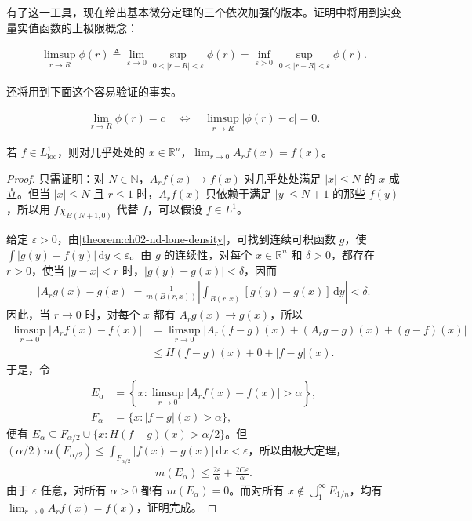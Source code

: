 \documentclass[../../main.tex]{subfiles}%
\begin{document}
有了这一工具，现在给出基本微分定理的三个依次加强的版本。证明中将用到实变量实值函数的上极限概念：
\begin{definition}[函数的上极限]\label{definition:ch03-function-limsup}
\begin{align*}
\limsup_{r\to R}\phi(r)
\triangleq\lim_{\varepsilon\to0}\sup_{0<|r-R|<\varepsilon}\phi(r)
=\inf_{\varepsilon>0}\sup_{0<|r-R|<\varepsilon}\phi(r).
\end{align*}
\end{definition}
还将用到下面这个容易验证的事实。
\begin{proposition}\label{proposition:ch03-limit-limsup-criterion}
\begin{align*}
\lim_{r\to R}\phi(r)=c\quad\Longleftrightarrow\quad\limsup_{r\to R}|\phi(r)-c|=0.
\end{align*}
\end{proposition}
\begin{theorem}\label{theorem:ch03-ball-differentiation}
若 $f\in L^1_{\mathrm{loc}}$，则对几乎处处的 $x\in\mathbb{R}^n$，$\lim_{r\to0}A_rf(x)=f(x)$。
\end{theorem}
\begin{proof}
只需证明：对 $N\in\mathbb{N}$，$A_rf(x)\to f(x)$ 对几乎处处满足 $|x|\le N$ 的 $x$ 成立。但当 $|x|\le N$ 且 $r\le1$ 时，$A_rf(x)$ 只依赖于满足 $|y|\le N+1$ 的那些 $f(y)$，所以用 $f\chi_{B(N+1,0)}$ 代替 $f$，可以假设 $f\in L^1$。

给定 $\varepsilon>0$，由\cref{theorem:ch02-nd-lone-density}，可找到连续可积函数 $g$，使 $\int|g(y)-f(y)|\,\mathrm{d}y<\varepsilon$。由 $g$ 的连续性，对每个 $x\in\mathbb{R}^n$ 和 $\delta>0$，都存在 $r>0$，使当 $|y-x|<r$ 时，$|g(y)-g(x)|<\delta$，因而
\begin{align*}
|A_rg(x)-g(x)|=\frac{1}{m(B(r,x))}\left|\int_{B(r,x)}[g(y)-g(x)]\,\mathrm{d}y\right|<\delta.
\end{align*}
因此，当 $r\to0$ 时，对每个 $x$ 都有 $A_rg(x)\to g(x)$，所以
\begin{align*}
\limsup_{r\to0}|A_rf(x)-f(x)|
&=\limsup_{r\to0}|A_r(f-g)(x)+(A_rg-g)(x)+(g-f)(x)|\\
&\le H(f-g)(x)+0+|f-g|(x).
\end{align*}
于是，令
\begin{align*}
E_\alpha&=\left\{x:\limsup_{r\to0}|A_rf(x)-f(x)|>\alpha\right\},\\
F_\alpha&=\{x:|f-g|(x)>\alpha\},
\end{align*}
便有 $E_\alpha\subseteq F_{\alpha/2}\cup\{x:H(f-g)(x)>\alpha/2\}$。但 $(\alpha/2)m(F_{\alpha/2})\le\int_{F_{\alpha/2}}|f(x)-g(x)|\,\mathrm{d}x<\varepsilon$，所以由极大定理，
\begin{align*}
m(E_\alpha)\le\frac{2\varepsilon}{\alpha}+\frac{2C\varepsilon}{\alpha}.
\end{align*}
由于 $\varepsilon$ 任意，对所有 $\alpha>0$ 都有 $m(E_\alpha)=0$。而对所有 $x\notin\bigcup_1^\infty E_{1/n}$，均有 $\lim_{r\to0}A_rf(x)=f(x)$，证明完成。
\end{proof}
\end{document}
